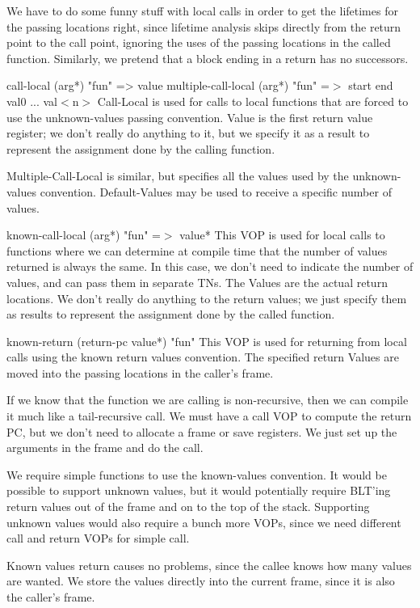 {\begin{itemize, spread 0, spacing 1}
We have to do some funny stuff with local calls in order to get the lifetimes
for the passing locations right, since lifetime analysis skips directly from
the return point to the call point, ignoring the uses of the passing locations
in the called function.  Similarly, we pretend that a block ending in a return
has no successors.

call-local (arg*) "fun" => value
multiple-call-local (arg*) "fun" =$>$ start end val0 ... val$<$n$>$
    Call-Local is used for calls to local functions that are forced to use the
    unknown-values passing convention.  Value is the first return value
    register; we don't really do anything to it, but we specify it as a result
    to represent the assignment done by the calling function.

    Multiple-Call-Local is similar, but specifies all the values used by the
    unknown-values convention.  Default-Values may be used to receive a
    specific number of values.

known-call-local (arg*) "fun" =$>$ value*
    This VOP is used for local calls to functions where we can determine at
    compile time that the number of values returned is always the same.  In
    this case, we don't need to indicate the number of values, and can pass
    them in separate TNs.  The Values are the actual return locations.  We
    don't really do anything to the return values; we just specify them as
    results to represent the assignment done by the called function.

known-return (return-pc value*) "fun"
    This VOP is used for returning from local calls using the known return
    values convention.  The specified return Values are moved into the passing
    locations in the caller's frame.


If we know that the function we are calling is non-recursive, then we can
compile it much like a tail-recursive call.  We must have a call VOP to compute
the return PC, but we don't need to allocate a frame or save registers.  We
just set up the arguments in the frame and do the call.

We require simple functions to use the known-values convention.  It would be
possible to support unknown values, but it would potentially require BLT'ing
return values out of the frame and on to the top of the stack.  Supporting
unknown values would also require a bunch more VOPs, since we need different
call and return VOPs for simple call.

Known values return causes no problems, since the callee knows how many values
are wanted.  We store the values directly into the current frame, since it is
also the caller's frame.


\end{itemize, spread 0, spacing 1}}

